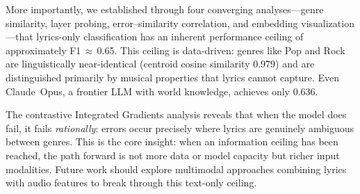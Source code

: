 \documentclass[11pt,a4paper]{article}
\begin{document}
More importantly, we established through four converging
analyses---genre similarity, layer probing, error--similarity
correlation, and embedding visualization---that lyrics-only
classification has an inherent performance ceiling of approximately
F1\,$\approx$\,0.65.
This ceiling is data-driven: genres like Pop and Rock are linguistically
near-identical (centroid cosine similarity 0.979) and are distinguished
primarily by musical properties that lyrics cannot capture.
Even Claude~Opus, a frontier LLM with world knowledge, achieves only
0.636.

The contrastive Integrated Gradients analysis reveals that when the
model does fail, it fails \emph{rationally}: errors occur precisely
where lyrics are genuinely ambiguous between genres.
This is the core insight: when an information ceiling has been reached,
the path forward is not more data or model capacity but richer input
modalities.
Future work should explore multimodal approaches combining lyrics
with audio features to break through this text-only ceiling.




\end{document}
